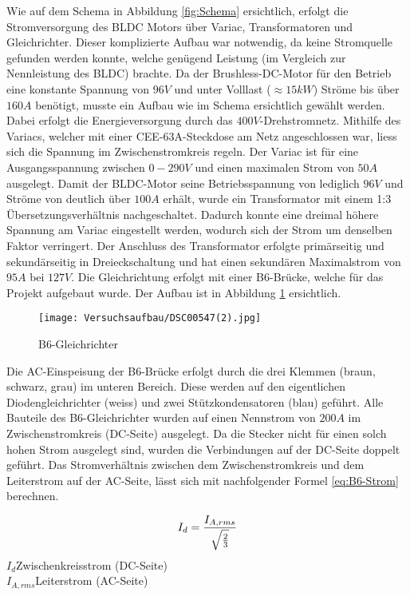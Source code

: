 Wie auf dem Schema in Abbildung \ref{fig:Schema} ersichtlich, erfolgt die Stromversorgung des BLDC Motors über Variac, Transformatoren und Gleichrichter. Dieser \glqq komplizierte \grqq Aufbau war notwendig, da keine Stromquelle gefunden werden konnte, welche genügend Leistung (im Vergleich zur Nennleistung des BLDC) brachte. Da der Brushless-DC-Motor für den Betrieb eine konstante Spannung von $96V$ und unter Volllast ($\approx15kW$) Ströme bis über $160A$ benötigt, musste ein Aufbau wie im Schema ersichtlich gewählt werden. Dabei erfolgt die Energieversorgung durch das $400V$-Drehstromnetz. Mithilfe des Variacs, welcher mit einer CEE-63A-Steckdose am Netz angeschlossen war, liess sich die Spannung im Zwischenstromkreis regeln. Der Variac ist für eine Ausgangsspannung zwischen $0-290V$ und einen maximalen Strom von $50A$ ausgelegt. Damit der BLDC-Motor seine Betriebsspannung von lediglich $96V$ und Ströme von deutlich über $100A$ erhält, wurde ein Transformator mit einem 1:3 Übersetzungsverhältnis nachgeschaltet. Dadurch konnte eine dreimal höhere Spannung am Variac eingestellt werden, wodurch sich der Strom um denselben Faktor verringert. Der Anschluss des Transformator erfolgte primärseitig und sekundärseitig in Dreieckschaltung und hat einen sekundären Maximalstrom von $95A$ bei $127V$. Die Gleichrichtung erfolgt mit einer B6-Brücke, welche für das Projekt aufgebaut wurde. Der Aufbau ist in Abbildung \ref{fig:B6} ersichtlich.

\begin{figure}[H]
	\centering
	\texttt{[image: Versuchsaufbau/DSC00547(2).jpg]}
	\caption[B6-Gleichrichter]{B6-Gleichrichter}
	\label{fig:B6}
\end{figure}

Die AC-Einspeisung der B6-Brücke erfolgt durch die drei Klemmen (braun, schwarz, grau) im unteren Bereich. Diese werden auf den eigentlichen Diodengleichrichter (weiss) und zwei Stützkondensatoren (blau) geführt. Alle Bauteile des B6-Gleichrichter wurden auf einen Nennstrom von $200A$ im Zwischenstromkreis (DC-Seite) ausgelegt. Da die Stecker nicht für einen solch hohen Strom ausgelegt sind, wurden die Verbindungen auf der DC-Seite doppelt geführt. Das Stromverhältnis zwischen dem Zwischenstromkreis und dem Leiterstrom auf der AC-Seite, lässt sich mit nachfolgender Formel \ref{eq:B6-Strom} berechnen.

\begin{equation}
\centering
I_{d}=\frac{I_{A,rms}}{\sqrt{\frac{2}{3}}}
\label{eq:B6-Strom}
\end{equation}
$ I_{d} $\qquad\quad 	Zwischenkreisstrom (DC-Seite)      \\
$ I_{A,rms} $\quad Leiterstrom (AC-Seite)    \\

